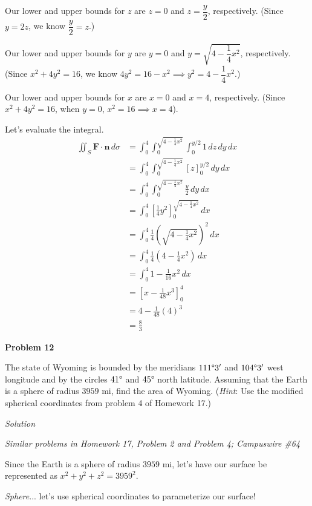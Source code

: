 \documentclass{article}
\newcommand{\lrp}[1]{\left( #1 \right)}
\newcommand{\lrb}[1]{\left[ #1 \right]}
\newcommand{\F}[0]{\mathbf{F}}
\newcommand{\n}[0]{{\mathbf{n}}}
\newcommand{\Solution}{\textit{Solution}}
\begin{document}
Our lower and upper bounds for $z$ are $z=0$ and $z=\dfrac{y}{2}$, respectively. (Since $y=2z$, we know $\dfrac{y}{2}=z$.)

Our lower and upper bounds for $y$ are $y=0$ and $y=\sqrt{4-\dfrac{1}{4}x^2}$, respectively. (Since $x^2+4y^2=16$, we know $4y^2=16-x^2\implies y^2=4-\dfrac{1}{4}x^2$.)

Our lower and upper bounds for $x$ are $x=0$ and $x=4$, respectively. (Since $x^2+4y^2=16$, when $y=0$, $x^2=16\implies x=4$).

Let's evaluate the integral.
\begin{align*}
    \iint_S \F\cdot\n\,d\sigma &=\int_0^4\int_0^{\sqrt{4-\frac{1}{4}x^2}}\int_0^{y/2}1\,dz\,dy\,dx\\
    &=\int_0^4\int_0^{\sqrt{4-\frac{1}{4}x^2}}\lrb{z}_0^{y/2}\,dy\,dx\\
    &=\int_0^4\int_0^{\sqrt{4-\frac{1}{4}x^2}}\frac{y}{2}\,dy\,dx\\
    &=\int_0^4\lrb{\frac{1}{4}y^2}_0^{\sqrt{4-\frac{1}{4}x^2}}\,dx\\
    &=\int_0^4 \frac{1}{4}\lrp{\sqrt{4-\frac{1}{4}x^2}}^2\,dx\\
    &=\int_0^4 \frac{1}{4}\lrp{4-\frac{1}{4}x^2}\,dx\\
    &=\int_0^4 1 - \frac{1}{16}x^2\,dx\\
    &=\lrb{x-\frac{1}{48}x^3}_0^4\\
    &=4-\frac{1}{48}(4)^3\\
    &=\boxed{\frac{8}{3}}\tag{use a calculator}
\end{align*}
{}\textbf{Problem 12}

The state of Wyoming is bounded by the meridians $111\degree3'$ and $104\degree3'$ west longitude and by the circles $41\degree$ and $45\degree$ north latitude. Assuming that the Earth is a sphere of radius $3959$ mi, find the area of Wyoming. (\textit{Hint}: Use the modified spherical coordinates from problem 4 of Homework 17.)

\Solution

\textit{Similar problems in Homework 17, Problem 2 and Problem 4; Campuswire \#64 }

Since the Earth is a sphere of radius $3959$ mi, let's have our surface be represented as $x^2+y^2+z^2=3959^2$.

\textit{Sphere}... let's use spherical coordinates to parameterize our surface!
\end{document}
